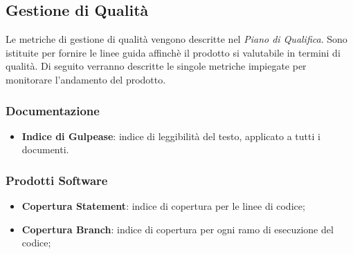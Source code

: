 \documentclass[a4paper, 12pt]{article}
\begin{document}
\subsection{Gestione di Qualità}
Le metriche di gestione di qualità vengono descritte nel \textit{Piano di Qualifica}. Sono istituite per fornire le linee guida affinchè il prodotto si valutabile in termini di qualità. Di seguito verranno descritte le singole metriche impiegate per monitorare l'andamento del prodotto.

\subsubsection{Documentazione}
\begin{itemize}
    \item \textbf{Indice di Gulpease}: indice di leggibilità del testo, applicato a tutti i documenti.
\end{itemize}

\subsubsection{Prodotti Software} 
\begin{itemize}
    \item \textbf{Copertura Statement}: indice di copertura per le linee di codice;
    \item \textbf{Copertura Branch}: indice di copertura per ogni ramo di esecuzione del codice;
\end{itemize}
\end{document}
